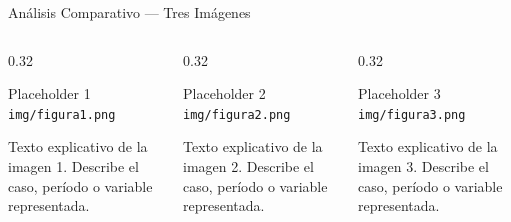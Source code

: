 \begin{frame}{Análisis Comparativo — Tres Imágenes}
  \begin{columns}[T]
    \begin{column}{0.32\textwidth}
      \centering
      \begin{alertblock}{\scriptsize Placeholder 1}
        \scriptsize\texttt{img/figura1.png}
      \end{alertblock}
      {\scriptsize Texto explicativo de la imagen 1. Describe el caso, período o variable representada.}\\[0.05cm]
    \end{column}
    \begin{column}{0.32\textwidth}
      \centering
      \begin{alertblock}{\scriptsize Placeholder 2}
        \scriptsize\texttt{img/figura2.png}
      \end{alertblock}
      {\scriptsize Texto explicativo de la imagen 2. Describe el caso, período o variable representada.}\\[0.05cm]
    \end{column}
    \begin{column}{0.32\textwidth}
      \centering
      \begin{alertblock}{\scriptsize Placeholder 3}
        \scriptsize\texttt{img/figura3.png}
      \end{alertblock}
      {\scriptsize Texto explicativo de la imagen 3. Describe el caso, período o variable representada.}\\[0.05cm]
    \end{column}
  \end{columns}
\end{frame}



